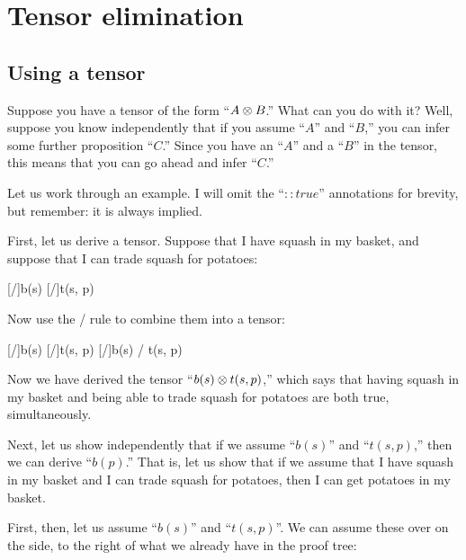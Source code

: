 \documentclass[../../../main.tex]{subfiles}
\begin{document}
\chapter{Tensor elimination}


\section{Using a tensor}

Suppose you have a tensor of the form ``$A \tensor/ B$.'' What can you do with it? Well, suppose you know independently that if you assume ``$A$'' and ``$B$,'' you can infer some further proposition ``$C$.'' Since you have an ``$A$'' and a ``$B$'' in the tensor, this means that you can go ahead and infer ``$C$.''

Let us work through an example. I will omit the ``$:: true$'' annotations for brevity, but remember: it is always implied. 

First, let us derive a tensor. Suppose that I have squash in my basket, and suppose that I can trade squash for potatoes:

\begin{prooftree*}
  \hypo{}
  [\startrule/]{b(s)}
  \hypo{}
  [\startrule/]{t(s, p)}
\end{prooftree*}

\noindent
Now use the \tensorIntro/ rule to combine them into a tensor:

\begin{prooftree*}
  \hypo{}
  [\startrule/]{b(s)}
  \hypo{}
  [\startrule/]{t(s, p)}
  [\startrule/]{b(s) \tensor/ t(s, p)}
\end{prooftree*}

\noindent
Now we have derived the tensor ``$b(s) \tensor/ t(s, p)$,'' which says that having squash in my basket and being able to trade squash for potatoes are both true, simultaneously.

Next, let us show independently that if we assume ``$b(s)$'' and ``$t(s, p)$,'' then we can derive ``$b(p)$.'' That is, let us show that if we assume that I have squash in my basket and I can trade squash for potatoes, then I can get potatoes in my basket.

First, then,  let us assume ``$b(s)$'' and ``$t(s, p)$''. We can assume these over on the side, to the right of what we already have in the proof tree:
\end{document}
